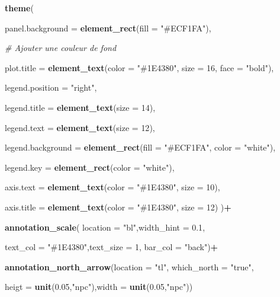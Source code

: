 \documentclass[
]{article}
\newenvironment{Shaded}{\begin{snugshade}}{\end{snugshade}}
\newcommand{\AttributeTok}[1]{\textcolor[rgb]{0.13,0.29,0.53}{#1}}
\newcommand{\CommentTok}[1]{\textcolor[rgb]{0.56,0.35,0.01}{\textit{#1}}}
\newcommand{\DecValTok}[1]{\textcolor[rgb]{0.00,0.00,0.81}{#1}}
\newcommand{\FloatTok}[1]{\textcolor[rgb]{0.00,0.00,0.81}{#1}}
\newcommand{\FunctionTok}[1]{\textcolor[rgb]{0.13,0.29,0.53}{\textbf{#1}}}
\newcommand{\NormalTok}[1]{#1}
\newcommand{\SpecialCharTok}[1]{\textcolor[rgb]{0.81,0.36,0.00}{\textbf{#1}}}
\newcommand{\StringTok}[1]{\textcolor[rgb]{0.31,0.60,0.02}{#1}}
\begin{document}
\begin{Shaded}
\begin{Highlighting}[]
   \FunctionTok{theme}\NormalTok{(}
     
    \AttributeTok{panel.background =} \FunctionTok{element\_rect}\NormalTok{(}\AttributeTok{fill =} \StringTok{"\#ECF1FA"}\NormalTok{),}
    
    \CommentTok{\# Ajouter une couleur de fond}
    
    \AttributeTok{plot.title =} \FunctionTok{element\_text}\NormalTok{(}\AttributeTok{color =} \StringTok{"\#1E4380"}\NormalTok{, }\AttributeTok{size =} \DecValTok{16}\NormalTok{, }\AttributeTok{face =} \StringTok{"bold"}\NormalTok{),}
    
    \AttributeTok{legend.position =} \StringTok{"right"}\NormalTok{,}
    
    \AttributeTok{legend.title =} \FunctionTok{element\_text}\NormalTok{(}\AttributeTok{size =} \DecValTok{14}\NormalTok{),}
    
    \AttributeTok{legend.text =} \FunctionTok{element\_text}\NormalTok{(}\AttributeTok{size =} \DecValTok{12}\NormalTok{),}
    
    \AttributeTok{legend.background =} \FunctionTok{element\_rect}\NormalTok{(}\AttributeTok{fill =} \StringTok{"\#ECF1FA"}\NormalTok{, }\AttributeTok{color =} \StringTok{"white"}\NormalTok{),}
    
    \AttributeTok{legend.key =} \FunctionTok{element\_rect}\NormalTok{(}\AttributeTok{color =} \StringTok{"white"}\NormalTok{),}
    
    \AttributeTok{axis.text =} \FunctionTok{element\_text}\NormalTok{(}\AttributeTok{color =} \StringTok{"\#1E4380"}\NormalTok{, }\AttributeTok{size =} \DecValTok{10}\NormalTok{),}
    
    \AttributeTok{axis.title =} \FunctionTok{element\_text}\NormalTok{(}\AttributeTok{color =} \StringTok{"\#1E4380"}\NormalTok{, }\AttributeTok{size =} \DecValTok{12}\NormalTok{)}
\NormalTok{  )}\SpecialCharTok{+}
  
  \FunctionTok{annotation\_scale}\NormalTok{( }\AttributeTok{location =} \StringTok{"bl"}\NormalTok{,}\AttributeTok{width\_hint =} \FloatTok{0.1}\NormalTok{,}
                    
  \AttributeTok{text\_col =} \StringTok{"\#1E4380"}\NormalTok{,}\AttributeTok{text\_size =} \DecValTok{1}\NormalTok{, }\AttributeTok{bar\_col =} \StringTok{"back"}\NormalTok{)}\SpecialCharTok{+}
  
    \FunctionTok{annotation\_north\_arrow}\NormalTok{(}\AttributeTok{location =} \StringTok{"tl"}\NormalTok{, }\AttributeTok{which\_north =}
                             \StringTok{"true"}\NormalTok{,}
                           
                         \AttributeTok{heigt =} \FunctionTok{unit}\NormalTok{(}\FloatTok{0.05}\NormalTok{,}\StringTok{"npc"}\NormalTok{),}\AttributeTok{width =} \FunctionTok{unit}\NormalTok{(}\FloatTok{0.05}\NormalTok{,}\StringTok{"npc"}\NormalTok{))}
\end{Highlighting}
\end{Shaded}
\end{document}
